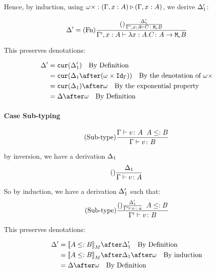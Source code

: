 \documentclass{report}
\begin{document}
    Hence, by induction, using $\omega\times : (\Gamma,x:  A) \triangleright (\Gamma, x: A)$, we derive $\Delta_1'$:

    \begin{equation}
        \Delta' = (\text{Fn}) \frac{
            (\text{}) \frac{\Delta_1'}{\Gamma',x: A \vdash C \colon \texttt{M}_{\epsilon}{B}}
        }{\Gamma',x: A \vdash \lambda x : A. C \colon A \rightarrow \texttt{M}_{\epsilon}{B}}
    \end{equation}

    This preserves denotations:


    \begin{align}
    \D' & = \cur{\D_1'} \qt{By Definition}\\
    & = \cur{\D_1\after(\w\times \idg)}\qt{By the denotation of $\w\x$} \\
    &= \cur{\D_1}\after\w\qt{By the exponential property}\\
    &= \D\after \w \qt{By Definition}
    \end{align}


    \paragraph{Case Sub-typing}

    \begin{equation}
        (\text{Sub-type}) \frac{\Gamma \vdash v \colon A\;\; A\leq: B}{\Gamma \vdash v \colon B}
    \end{equation}

    by inversion, we have a derivation $\Delta_1$
    \begin{equation}
        (\text{}) \frac{\Delta_1}{\Gamma \vdash v \colon A}
    \end{equation}

    So by induction, we have a derivation $\Delta_1'$ such that:
    \begin{equation}
        (\text{Sub-type}) \frac{(\text{}) \frac{\Delta_1'}{\Gamma' \vdash v \colon a}\;\; A \leq: B}{\Gamma' \vdash v \colon B}
    \end{equation}

    This preserves denotations:

    \begin{align}
        \D' & = \deno{A\subtype B}\after \D_1' \qt{By Definition} \\
        & = \deno{A\subtype B}\after \D_1\after\w \qt{By induction}\\
        & = \D\after\w \qt{By Definition}\\
    \end{align}
\end{document}
